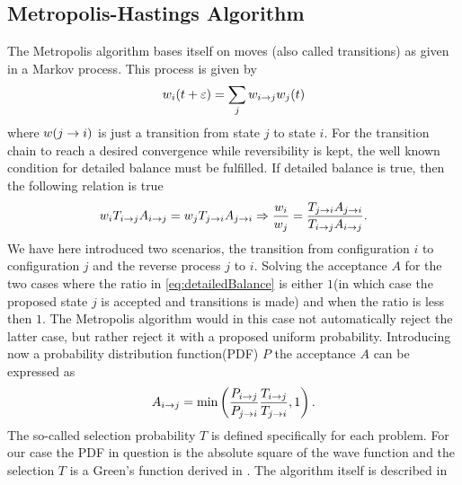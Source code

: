     \subsection{Metropolis-Hastings Algorithm\label{susec:MHAlg}}
        The Metropolis algorithm bases itself on moves (also called
        transitions) as given in a Markov process\cite{NeOr, FeWa}. This
        process is given by
            \begin{equation}
                w_i(t+\varepsilon) = \sum_jw_{i\rightarrow j}w_j(t)
            \end{equation}
        where $w(j\rightarrow i)$ is just a transition from state $j$ to state $i$.
        For the transition chain to reach a desired convergence while
        reversibility is kept, the well known condition for detailed balance
        must be fulfilled\cite{statmech}. If detailed balance is true, then the
        following relation is true
            \begin{equation}
                w_i T_{i\rightarrow j}A_{i\rightarrow j} = w_j T_{j\rightarrow i}A_{j\rightarrow i}
                \Rightarrow \frac{w_i}{w_j} =
                \frac{T_{j\rightarrow i}A_{j\rightarrow i}}{T_{i\rightarrow j}A_{i\rightarrow j}}.
                \label{eq:detailedBalance}
            \end{equation}
        We have here introduced two scenarios, the transition from
        configuration $i$ to configuration $j$ and the reverse process $j$ to
        $i$. Solving the acceptance $A$ for the two cases where the ratio in
        \ref{eq:detailedBalance} is either $1$(in which case the proposed state
        $j$ is accepted and transitions is made) and when the ratio is less
        then $1$. The Metropolis algorithm would in this case not automatically
        reject the latter case, but rather reject it with a proposed uniform
        probability. Introducing now a probability distribution function(PDF) $P$
        the acceptance $A$ can be expressed as
            \begin{equation}
                A_{i\rightarrow j} =
                \text{min}\left(\frac{P_{i\rightarrow j}}{P_{j\rightarrow i}}
                \frac{T_{i\rightarrow j}}{T_{j\rightarrow i}} ,1\right).
                \label{eq:metropolisAcceptance}
            \end{equation}
        The so-called selection probability $T$ is defined specifically for
        each problem. For our case the PDF in question is the absolute square
        of the wave function and the selection $T$ is a Green's function
        derived in . The algorithm itself is described in
